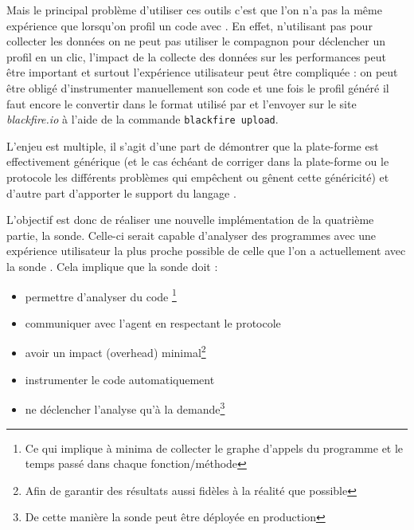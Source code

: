 Mais le principal problème d'utiliser ces outils c'est que l'on n'a pas la même expérience que lorsqu'on profil un code \PHP avec \Blackfire. En effet, n'utilisant pas \Blackfire pour collecter les données on ne peut pas utiliser le compagnon pour déclencher un profil en un clic, l'impact de la collecte des données sur les performances peut être important et surtout l'expérience utilisateur peut être compliquée : on peut être obligé d'instrumenter manuellement son code et une fois le profil généré il faut encore le convertir dans le format utilisé par \Blackfire et l'envoyer sur le site \emph{blackfire.io} à l'aide de la commande \verb|blackfire upload|.

L'enjeu est multiple, il s'agit d'une part de démontrer que la plate-forme \Blackfire est effectivement générique (et le cas échéant de corriger dans la plate-forme ou le protocole les différents problèmes qui empêchent ou gênent cette généricité) et d'autre part d'apporter le support du langage \Python.

L'objectif est donc de réaliser une nouvelle implémentation de la quatrième partie, la sonde. Celle-ci serait capable d'analyser des programmes \Python avec une expérience utilisateur la plus proche possible de celle que l'on a actuellement avec la sonde \PHP. Cela implique que la sonde doit :
\begin{itemize}
  \item permettre d'analyser du code \Python\footnote{Ce qui implique à minima de collecter le graphe d'appels du programme et le temps passé dans chaque fonction/méthode}
  \item communiquer avec l'agent en respectant le protocole
  \item avoir un impact (\gls{overhead}) minimal\footnote{Afin de garantir des résultats aussi fidèles à la réalité que possible}
  \item instrumenter le code automatiquement
  \item ne déclencher l'analyse qu'à la demande\footnote{De cette manière la sonde peut être déployée en production}
\end{itemize}

\setcounter{part}{0}
\setcounter{chapter}{0} 